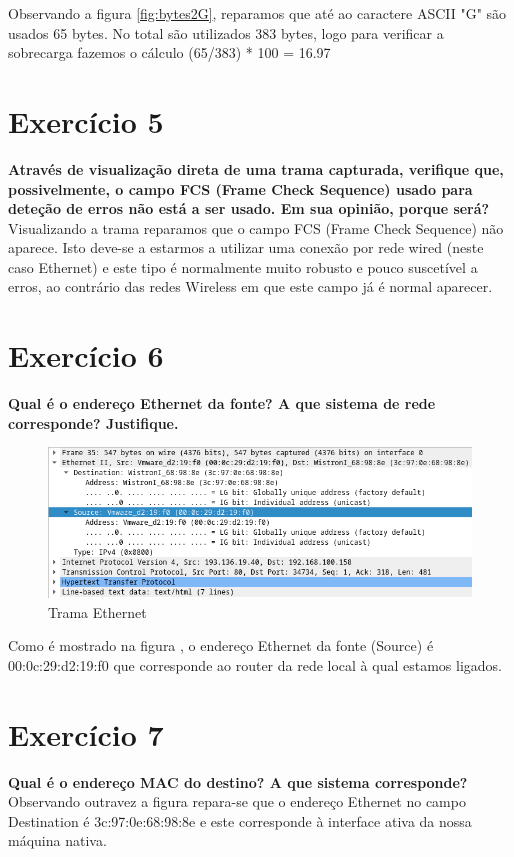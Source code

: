 \documentclass[a4paper]{report}
\begin{document}
Observando a figura \ref{fig:bytes2G}, reparamos que até ao caractere ASCII "G"
são usados 65 bytes.
No total são utilizados 383 bytes, logo para verificar a sobrecarga fazemos o
cálculo (65/383) * 100 = 16.97%

\section{Exercício 5}
\textbf{Através de visualização direta de uma trama capturada, verifique que,
possivelmente, o campo FCS (Frame Check Sequence) usado para deteção de erros
não está a ser usado. Em sua opinião, porque será?}
Visualizando a trama reparamos que o campo FCS (Frame Check Sequence) não aparece.
Isto deve-se a estarmos a utilizar uma conexão por rede wired (neste caso Ethernet) e
este tipo é normalmente muito robusto e pouco suscetível a erros, ao contrário das redes
Wireless em que este campo já é normal aparecer.

\section{Exercício 6}
\textbf{Qual é o endereço Ethernet da fonte? A que sistema de rede corresponde?
Justifique.}

\begin{figure}[H]
    \centering 
    \includegraphics[width=\textwidth]{images/678.png}
    \caption{Trama Ethernet}
    \label{fig:678}
\end{figure}
Como é mostrado na figura , o endereço Ethernet da fonte (Source) é 
00:0c:29:d2:19:f0 que corresponde ao router da rede local à qual estamos ligados.

\section{Exercício 7}
\textbf{Qual é o endereço MAC do destino? A que sistema corresponde?}
Observando outravez a figura  repara-se que o endereço Ethernet
no campo Destination é 3c:97:0e:68:98:8e e este corresponde à interface ativa da
nossa máquina nativa.
\end{document}
